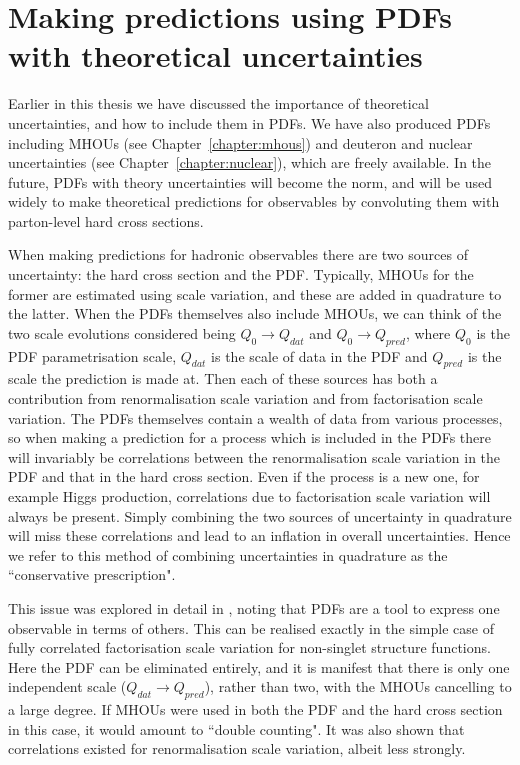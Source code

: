 \chapter{Making predictions using PDFs with theoretical uncertainties}
\label{chapter:correlations}
Earlier in this thesis we have discussed the importance of theoretical uncertainties, and how to include them in PDFs. We have also produced PDFs including MHOUs (see Chapter~\ref{chapter:mhous}) and deuteron and nuclear uncertainties (see Chapter~\ref{chapter:nuclear}), which are freely available. In the future, PDFs with theory uncertainties will become the norm, and will be used widely to make theoretical predictions for observables by convoluting them with parton-level hard cross sections. 

When making predictions for hadronic observables there are two sources of uncertainty: the hard cross section and the PDF. Typically, MHOUs for the former are estimated using scale variation, and these are added in quadrature to the latter. When the PDFs themselves also include MHOUs, we can think of the two scale evolutions considered being $Q_0 \to Q_{dat}$ and $Q_0 \to Q_{pred}$, where $Q_0$ is the PDF parametrisation scale, $Q_{dat}$ is the scale of data in the PDF and $Q_{pred}$ is the scale the prediction is made at. Then each of these sources has both a contribution from renormalisation scale variation and from factorisation scale variation.  The PDFs themselves contain a wealth of data from various processes, so when making a prediction for a process which is included in the PDFs there will invariably be correlations between the renormalisation scale variation in the PDF and that in the hard cross section. Even if the process is a new one, for example Higgs production, correlations due to factorisation scale variation will always be present. Simply combining the two sources of uncertainty in quadrature will miss these correlations and lead to an inflation in overall uncertainties. Hence we refer to this method of combining uncertainties in quadrature as the ``conservative prescription".

This issue was explored in detail in \cite{Harland-Lang:2018bxd}, noting that PDFs are a tool to express one observable in terms of others. This can be realised exactly in the simple case of fully correlated factorisation scale variation for non-singlet structure functions. Here the PDF can be eliminated entirely, and it is manifest that there is only one independent scale ($Q_{dat} \to Q_{pred}$), rather than two, with the MHOUs cancelling to a large degree. If MHOUs were used in both the PDF and the hard cross section in this case, it would amount to ``double counting". It was also shown that correlations existed for renormalisation scale variation, albeit less strongly.

